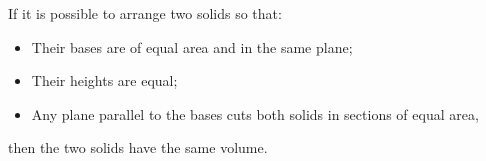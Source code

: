 If it is possible to arrange two solids so that:
\begin{itemize}
\item Their bases are of equal area and in the same plane;
\item Their heights are equal;
\item Any plane parallel to the bases cuts both solids in sections of equal area,
\end{itemize}
then the two solids have the same volume.
  